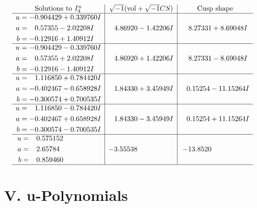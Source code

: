 \documentclass[1p]{elsarticle_modified}
\theoremstyle{definition}
\newcommand{\I}{\sqrt{-1}}
\begin{document}
$$\begin{array}{c|c|c}  
\text{Solutions to }I^u_{4}& \I (\text{vol} + \sqrt{-1}CS) & \text{Cusp shape}\\
 \hline 
\begin{aligned}
u &= -0.904429 + 0.339760 I \\
a &= \phantom{-}0.57355 - 2.02208 I \\
b &= -0.12916 + 1.40912 I\end{aligned}
 & \phantom{-}4.86920 - 1.42206 I & \phantom{-}8.27331 + 8.69048 I \\ \hline\begin{aligned}
u &= -0.904429 - 0.339760 I \\
a &= \phantom{-}0.57355 + 2.02208 I \\
b &= -0.12916 - 1.40912 I\end{aligned}
 & \phantom{-}4.86920 + 1.42206 I & \phantom{-}8.27331 - 8.69048 I \\ \hline\begin{aligned}
u &= \phantom{-}1.116850 + 0.784420 I \\
a &= -0.402467 - 0.658928 I \\
b &= -0.300574 + 0.700535 I\end{aligned}
 & \phantom{-}1.84330 + 3.45949 I & \phantom{-}0.15254 - 11.15264 I \\ \hline\begin{aligned}
u &= \phantom{-}1.116850 - 0.784420 I \\
a &= -0.402467 + 0.658928 I \\
b &= -0.300574 - 0.700535 I\end{aligned}
 & \phantom{-}1.84330 - 3.45949 I & \phantom{-}0.15254 + 11.15264 I \\ \hline\begin{aligned}
u &= \phantom{-}0.575152\phantom{ +0.000000I} \\
a &= \phantom{-}2.65784\phantom{ +0.000000I} \\
b &= \phantom{-}0.859460\phantom{ +0.000000I}\end{aligned}
 & -3.55538\phantom{ +0.000000I} & -13.8520\phantom{ +0.000000I}\\
 \hline 
 \end{array}$$\newpage
\newpage\renewcommand{\arraystretch}{1}
\centering \section*{ V. u-Polynomials}
\end{document}
